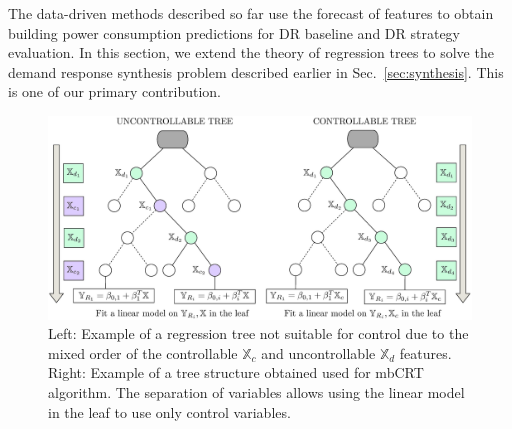 The data-driven methods described so far use the forecast of features to obtain building power consumption predictions  for DR baseline and DR strategy evaluation.
In this section, we extend the theory of regression trees to solve the demand response synthesis problem described earlier in Sec.~\ref{sec:synthesis}. This is one of our primary contribution.

\begin{figure}
\centering
\includegraphics[width=0.95\columnwidth]{Figures/sep_vars.eps}
   \caption{Left: Example of a regression tree not suitable for control due to the mixed order of the controllable $\mathbb{X}_c$ and uncontrollable $\mathbb{X}_d$ features. Right: Example of a tree structure obtained used for mbCRT algorithm. The separation of variables allows using the linear model in the leaf to use only control variables.}
   \captionsetup{justification=centering}
   \label{fig:training}
\end{figure}

